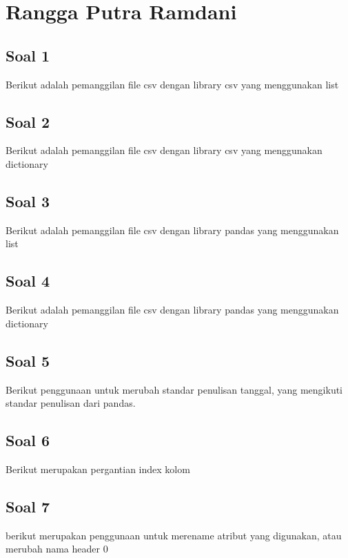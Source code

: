 \section{Rangga Putra Ramdani}
\subsection{Soal 1}
Berikut adalah pemanggilan file csv dengan library csv yang menggunakan list


\subsection{Soal 2}
Berikut adalah pemanggilan file csv dengan library csv yang menggunakan dictionary


\subsection{Soal 3}
Berikut adalah pemanggilan file csv dengan library pandas yang menggunakan list


\subsection{Soal 4}
Berikut adalah pemanggilan file csv dengan library pandas yang menggunakan dictionary


\subsection{Soal 5}
Berikut penggunaan untuk merubah standar penulisan tanggal, yang mengikuti standar penulisan dari pandas.


\subsection{Soal 6}
Berikut merupakan pergantian index kolom


\subsection{Soal 7}
berikut merupakan penggunaan untuk merename atribut yang digunakan, atau merubah nama header 0


